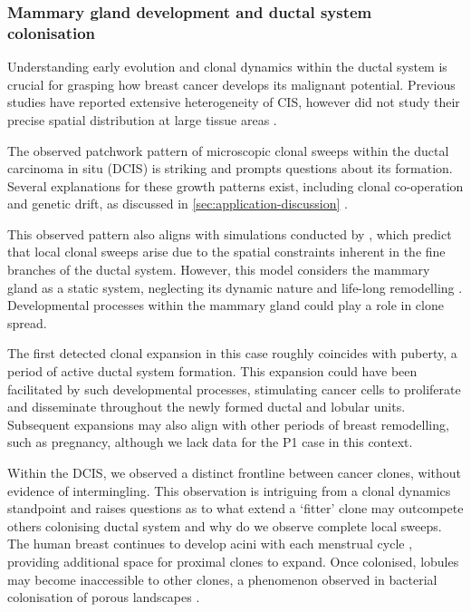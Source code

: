 
\subsubsection*{Mammary gland development and ductal system colonisation}

Understanding early evolution and clonal dynamics within the ductal system is crucial for grasping how breast cancer develops its malignant potential. Previous studies have reported extensive heterogeneity of \acf{CIS}, however did not study their precise spatial distribution at large tissue areas \parencite{Casasent2018-gx,Nishimura2023-mk,Yates2015-xk}. 

The observed patchwork pattern of microscopic clonal sweeps within the ductal carcinoma in situ (\ac{DCIS}) is striking and prompts questions about its formation. Several explanations for these growth patterns exist, including clonal co-operation and genetic drift, as discussed in \cref{sec:application-discussion} \parencite{Janiszewska2019-zq,Turajlic2019-sr}.

This observed pattern also aligns with simulations conducted by \textcite{West2021-ar}, which predict that local clonal sweeps arise due to the spatial constraints inherent in the fine branches of the ductal system. However, this model considers the mammary gland as a static system, neglecting its dynamic nature and life-long remodelling . Developmental processes within the mammary gland could play a role in clone spread.

The first detected clonal expansion in this case roughly coincides with puberty, a period of active ductal system formation. This expansion could have been facilitated by such developmental processes, stimulating cancer cells to proliferate and disseminate throughout the newly formed ductal and lobular units. Subsequent expansions may also align with other periods of breast remodelling, such as pregnancy, although we lack data for the P1 case in this context.

Within the \ac{DCIS}, we observed a distinct frontline between cancer clones, without evidence of intermingling. This observation is intriguing from a clonal dynamics standpoint and raises questions as to what extend a `fitter' clone may outcompete others colonising ductal system and why do we observe complete local sweeps. The human breast continues to develop acini with each menstrual cycle \parencite{Javed2013-ew}, providing additional space for proximal clones to expand. Once colonised, lobules may become inaccessible to other clones, a phenomenon observed in bacterial colonisation of porous landscapes \parencite{Conwill2022-sp}.

